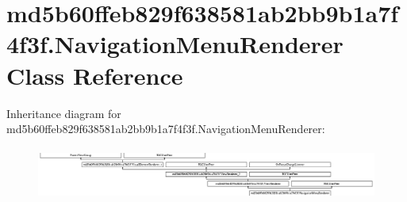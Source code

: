 \hypertarget{classmd5b60ffeb829f638581ab2bb9b1a7f4f3f_1_1NavigationMenuRenderer}{}\section{md5b60ffeb829f638581ab2bb9b1a7f4f3f.\+Navigation\+Menu\+Renderer Class Reference}
\label{classmd5b60ffeb829f638581ab2bb9b1a7f4f3f_1_1NavigationMenuRenderer}
Inheritance diagram for md5b60ffeb829f638581ab2bb9b1a7f4f3f.\+Navigation\+Menu\+Renderer\+:\begin{figure}[H]
\begin{center}
\leavevmode
\includegraphics[height=1.754386cm]{classmd5b60ffeb829f638581ab2bb9b1a7f4f3f_1_1NavigationMenuRenderer}
\end{center}
\end{figure}
